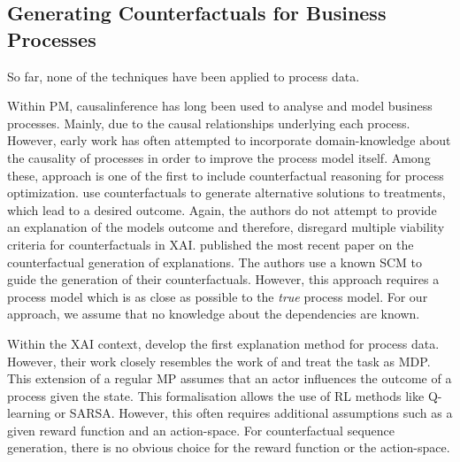 \documentclass[./../../paper.tex]{subfiles}
\begin{document}
\subsection{Generating Counterfactuals for Business Processes}
So far, none of the techniques have been applied to process data.

Within \gls{PM}, \gls{causalinference} has long been used to analyse and model business processes. Mainly, due to the causal relationships underlying each process. However, early work has often attempted to incorporate domain-knowledge about the causality of processes in order to improve the process model itself\cite{shook_assessmentusestructural_2004,baker_ClosingLoopEmpirical_2017,hompes_DiscoveringCausalFactors_2017,wang_CounterfactualDataAugmentedSequential_2021}.
Among these, \citeauthor{narendra_CounterfactualReasoningProcess_2019} approach is one of the first to include counterfactual reasoning for process optimization\cite{narendra_CounterfactualReasoningProcess_2019}.
\citeauthor{oberst_CounterfactualOffPolicyEvaluation_2019} use counterfactuals to generate alternative solutions to treatments, which lead to a desired outcome\cite{oberst_CounterfactualOffPolicyEvaluation_2019}.
Again, the authors do not attempt to provide an explanation of the models outcome and therefore, disregard multiple viability criteria for counterfactuals in \gls{XAI}. \citeauthor{qafari_CaseLevelCounterfactual_2021} published the most recent paper on the counterfactual generation of explanations\cite{qafari_CaseLevelCounterfactual_2021}. The authors use a known \gls{SCM} to guide the generation of their counterfactuals. However, this approach requires a process model which is as close as possible to the \emph{true} process model. For our approach, we assume that no knowledge about the dependencies are known.

Within the \gls{XAI} context, \citeauthor{tsirtsis_CounterfactualExplanationsSequential_2021} develop the first explanation method for process data\cite{tsirtsis_CounterfactualExplanationsSequential_2021}. However, their work closely resembles the work of \citeauthor{oberst_CounterfactualOffPolicyEvaluation_2019} and treat the task as \gls{MDP}\cite{oberst_CounterfactualOffPolicyEvaluation_2019}. This extension of a regular \gls{MP} assumes that an actor influences the outcome of a process given the state. This formalisation allows the use of \gls{RL} methods like Q-learning or SARSA. However, this often requires additional assumptions such as a given reward function and an action-space. For counterfactual sequence generation, there is no obvious choice for the reward function or the action-space. 
\end{document}
